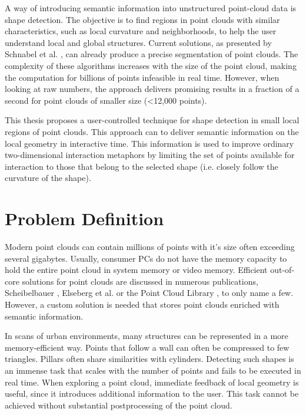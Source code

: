 \par

A way of introducing semantic information into unstructured point-cloud data is shape detection. The objective is to find regions in point clouds with similar characteristics, such as local curvature and neighborhoods, to help the user understand local and global structures. Current solutions, as presented by Schnabel et al. \cite{schnabel-2007-efficient, schnabel-2007-ransac}, can already produce a precise segmentation of point clouds. The complexity of these algorithms increases with the size of the point cloud, making the computation for billions of points infeasible in real time. However, when looking at raw numbers, the approach delivers promising results in a fraction of a second for point clouds of smaller size (<12,000 points).

\par

This thesis proposes a user-controlled technique for shape detection in small local regions of point clouds. This approach can to deliver semantic information on the local geometry in interactive time. This information is used to improve ordinary two-dimensional interaction metaphors by limiting the set of points available for interaction to those that belong to the selected shape (i.e. closely follow the curvature of the shape). 


\section{Problem Definition}

Modern point clouds can contain millions of points with it's size often exceeding several gigabytes. Usually, consumer PCs do not have the memory capacity to hold the entire point cloud in system memory or video memory. Efficient out-of-core solutions for point clouds are discussed in numerous publications, Scheibelbauer \cite{scheiblauer-thesis}, Elseberg et al. \cite{elseberg2013one} or the Point Cloud Library \cite{rusu20113d}, to only name a few. However, a custom solution is needed that stores point clouds enriched with semantic information.

\par

In scans of urban environments, many structures can be represented in a more memory-efficient way. Points that follow a wall can often be compressed to few triangles. Pillars often share similarities with cylinders. Detecting such shapes is an immense task that scales with the number of points and fails to be executed in real time. When exploring a point cloud, immediate feedback of local geometry is useful, since it introduces additional information to the user. This task cannot be achieved without substantial postprocessing of the point cloud. 

